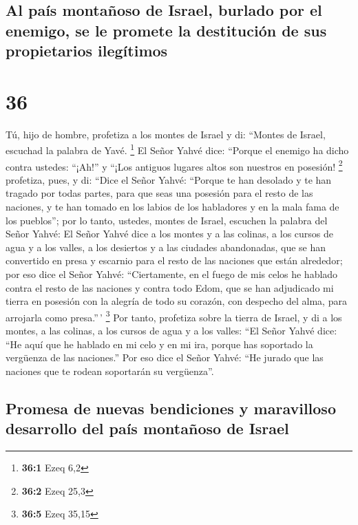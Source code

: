 \hypertarget{al-pauxeds-montauxf1oso-de-israel-burlado-por-el-enemigo-se-le-promete-la-destituciuxf3n-de-sus-propietarios-ileguxedtimos}{%
\subsection{Al país montañoso de Israel, burlado por el enemigo, se le
promete la destitución de sus propietarios
ilegítimos}\label{al-pauxeds-montauxf1oso-de-israel-burlado-por-el-enemigo-se-le-promete-la-destituciuxf3n-de-sus-propietarios-ileguxedtimos}}

\hypertarget{section-35}{%
\section{36}\label{section-35}}

 Tú, hijo de hombre, profetiza a los montes de Israel y
di: ``Montes de Israel, escuchad la palabra de Yavé. \footnote{\textbf{36:1}
  Ezeq 6,2}  El Señor Yahvé dice: ``Porque el enemigo ha
dicho contra ustedes: ``¡Ah!'' y ``¡Los antiguos lugares altos son
nuestros en posesión! \footnote{\textbf{36:2} Ezeq 25,3} 
profetiza, pues, y di: ``Dice el Señor Yahvé: ``Porque te han desolado y
te han tragado por todas partes, para que seas una posesión para el
resto de las naciones, y te han tomado en los labios de los habladores y
en la mala fama de los pueblos'';  por lo tanto, ustedes,
montes de Israel, escuchen la palabra del Señor Yahvé: El Señor Yahvé
dice a los montes y a las colinas, a los cursos de agua y a los valles,
a los desiertos y a las ciudades abandonadas, que se han convertido en
presa y escarnio para el resto de las naciones que están alrededor;
 por eso dice el Señor Yahvé: ``Ciertamente, en el fuego
de mis celos he hablado contra el resto de las naciones y contra todo
Edom, que se han adjudicado mi tierra en posesión con la alegría de todo
su corazón, con despecho del alma, para arrojarla como presa.''\,'
\footnote{\textbf{36:5} Ezeq 35,15}  Por tanto, profetiza
sobre la tierra de Israel, y di a los montes, a las colinas, a los
cursos de agua y a los valles: ``El Señor Yahvé dice: ``He aquí que he
hablado en mi celo y en mi ira, porque has soportado la vergüenza de las
naciones.''  Por eso dice el Señor Yahvé: ``He jurado que
las naciones que te rodean soportarán su vergüenza''.

\hypertarget{promesa-de-nuevas-bendiciones-y-maravilloso-desarrollo-del-pauxeds-montauxf1oso-de-israel}{%
\subsection{Promesa de nuevas bendiciones y maravilloso desarrollo del
país montañoso de
Israel}\label{promesa-de-nuevas-bendiciones-y-maravilloso-desarrollo-del-pauxeds-montauxf1oso-de-israel}}


